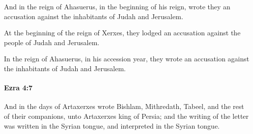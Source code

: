 			\begin{versebox}
					\item[BHS] 
					\item[LXX] 
					\item[ASV] And in the reign of Ahasuerus, in the beginning of his reign, wrote they an accusation against the inhabitants of Judah and Jerusalem.
					\item[NIV] At the beginning of the reign of Xerxes, they lodged an accusation against the people of Judah and Jerusalem.
					\item[NRSV] In the reign of Ahasuerus, in his accession year, they wrote an accusation against the inhabitants of Judah and Jerusalem.
			\end{versebox}

		\paragraph{Ezra 4:7} %
			\label{EZRA-4-7}

			And in the days of Artaxerxes wrote Bishlam, Mithredath, Tabeel, and the rest of their companions, unto Artaxerxes king of Persia; and the writing of the letter was written in the Syrian tongue, and interpreted in the Syrian tongue.

